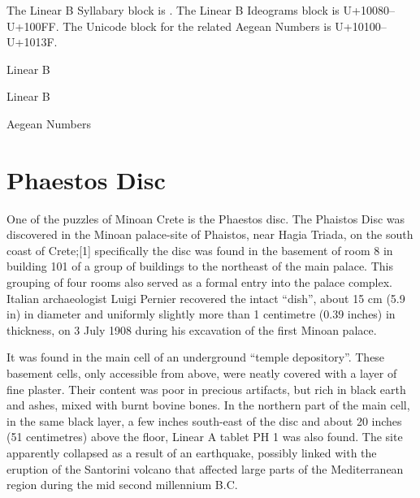 The Linear B Syllabary block is . The Linear B Ideograms block is {\smallcps U+10080–U+100FF}. The Unicode block for the related Aegean Numbers is U+10100–U+1013F.

\begin{scriptexample}[]{Linear B}

\end{scriptexample}

\begin{scriptexample}[]{Linear B}
\end{scriptexample}


\begin{scriptexample}[]{Aegean Numbers}

\end{scriptexample}





\section{Phaestos Disc}


One of the puzzles of Minoan Crete is the Phaestos disc. The Phaistos Disc was discovered in the Minoan palace-site of Phaistos, near Hagia Triada, on the south coast of Crete;[1] specifically the disc was found in the basement of room 8 in building 101 of a group of buildings to the northeast of the main palace. This grouping of four rooms also served as a formal entry into the palace complex. Italian archaeologist Luigi Pernier recovered the intact \enquote{dish}, about 15 cm (5.9 in) in diameter and uniformly slightly more than 1 centimetre (0.39 inches) in thickness, on 3 July 1908 during his excavation of the first Minoan palace.

It was found in the main cell of an underground \enquote{temple depository}. These basement cells, only accessible from above, were neatly covered with a layer of fine plaster. Their content was poor in precious artifacts, but rich in black earth and ashes, mixed with burnt bovine bones. In the northern part of the main cell, in the same black layer, a few inches south-east of the disc and about 20 inches (51 centimetres) above the floor, Linear A tablet PH 1 was also found. The site apparently collapsed as a result of an earthquake, possibly linked with the eruption of the Santorini volcano that affected large parts of the Mediterranean region during the mid second millennium B.C.

